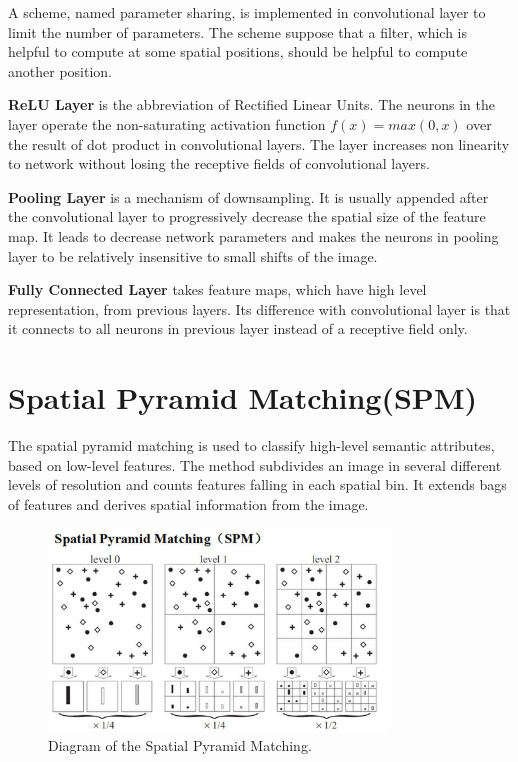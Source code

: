 A scheme, named parameter sharing, is implemented in convolutional layer to limit the number of parameters. The scheme suppose that a filter, which is helpful to compute at some spatial positions, should be helpful to compute another position.

\textbf{ReLU Layer} is the abbreviation of Rectified Linear Units. The neurons in the layer operate the non-saturating activation function $f(x) = max(0,x)$ over the result of dot product in convolutional layers. The layer increases non linearity to network without losing the receptive fields of convolutional layers.

\textbf{Pooling Layer} is a mechanism of downsampling. It is usually appended after the convolutional layer to progressively decrease the spatial size of the feature map. It leads to decrease network parameters and makes the neurons in pooling layer to be relatively insensitive to small shifts of the image.

\textbf{Fully Connected Layer} takes feature maps, which have high level representation, from previous layers. Its difference with convolutional layer is that it connects to all neurons in previous layer instead of a receptive field only.

\section{Spatial Pyramid Matching(SPM)}

The spatial pyramid matching\citep{lazebnik2006beyond} is used to classify high-level semantic attributes, based on low-level features. The method subdivides an image in several different levels of resolution and counts features falling in each spatial bin. It extends bags of features and derives spatial information from the image.
\graphicspath{ {./Figures/} }
\begin{figure}[!htb]
\centering
\includegraphics[width=0.8\textwidth]{spm.jpg}
\caption{\label{fig:SpatialPyramidMatching}Diagram of the Spatial Pyramid Matching.}
\end{figure}

